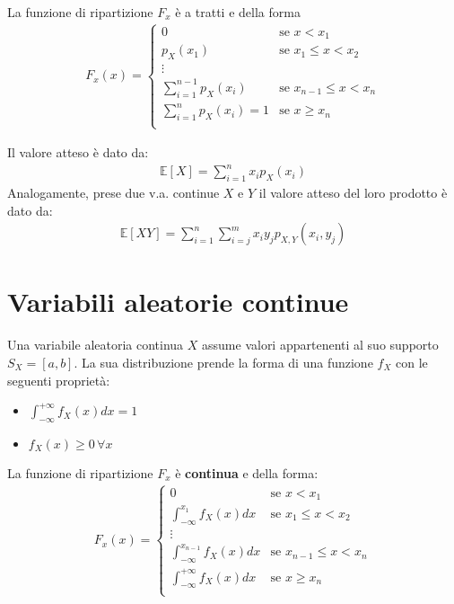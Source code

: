 \documentclass{article}
\begin{document}
La funzione di ripartizione $F_x$ \`e a tratti e della forma
\begin{align*}
F_x(x) = \begin{cases}
0 &\text{se } x < x_1 \\
p_X(x_1) &\text{se } x_1 \leq x < x_2 \\
\vdots \\
\sum_{i=1}^{n-1} p_X(x_i) &\text{se } x_{n-1} \leq x < x_{n} \\
\sum_{i=1}^n p_X(x_i) = 1 &\text{se } x \geq x_n \\
\end{cases}
\end{align*}

Il valore atteso \`e dato da:
\begin{align*}
\mathbb{E}[X] = \sum_{i=1}^n x_i p_X(x_i)
\end{align*}
Analogamente, prese due v.a. continue $X$ e $Y$ il valore atteso del loro
prodotto \`e dato da:
\begin{align*}
  \mathbb{E}[XY] = \sum_{i=1}^n\sum_{i=j}^m x_i y_j p_{X,Y}(x_i, y_j)
\end{align*}

\section{Variabili aleatorie continue}

Una variabile aleatoria continua $X$ assume valori appartenenti al suo supporto $S_X = [a, b]$.
La sua distribuzione prende la forma di una funzione $f_X$ con le seguenti propriet\`a:
\begin{itemize}
\item $\int_{-\infty}^{+\infty}f_X(x) dx = 1$
\item $f_X(x) \geq 0 \, \forall x$
\end{itemize}

La funzione di ripartizione $F_x$ \`e \textbf{continua} e della forma:
\begin{align*}
F_x(x) = \begin{cases}
0 &\text{se } x < x_1 \\
\int_{-\infty}^{x_1}f_X(x) dx &\text{se } x_1 \leq x < x_2 \\
\vdots \\
\int_{-\infty}^{x_{n-1}}f_X(x) dx &\text{se } x_{n-1} \leq x < x_n \\
\int_{-\infty}^{+\infty}f_X(x) dx &\text{se } x \geq x_n \\
\end{cases}
\end{align*}
\end{document}
